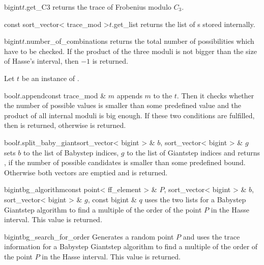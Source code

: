 \begin{cfcode}{bigint}{$t$.get_C3}{}
  returns the trace of Frobenius modulo $C_3$.
\end{cfcode}

\begin{cfcode}{const sort_vector< trace_mod >}{$t$.get_list}{}
  returns the list of s stored internally.
\end{cfcode}

\begin{fcode}{bigint}{$t$.number_of_combinations}{}
  returns the total number of possibilities which have to be checked.  If the product of the
  three moduli is not bigger than the size of Hasse's interval, then $-1$ is returned.
\end{fcode}



\HIGH

Let $t$ be an instance of .

\begin{fcode}{bool}{$t$.append}{const trace_mod & $m$}
  appends $m$ to the  $t$.  Then it checks whether the number of possible
  values is smaller than some predefined value and the product of all internal moduli is big
  enough.  If these two conditions are fulfilled, then \TRUE is returned, otherwise \FALSE is
  returned.
\end{fcode}

\begin{fcode}{bool}{$t$.split_baby_giant}{sort_vector< bigint > & $b$,
    sort_vector< bigint > & $g$}%
  sets $b$ to the list of Babystep indices, $g$ to the list of Giantstep indices and returns
  \TRUE, if the number of possible candidates is smaller than some predefined bound.  Otherwise
  both vectors are emptied and \FALSE is returned.
\end{fcode}

\begin{fcode}{bigint}{bg_algorithm}{const point< ff_element > & $P$,
    sort_vector< bigint > & $b$, sort_vector< bigint > & $g$, const bigint & $q$}%
  uses the two lists for a Babystep Giantstep algorithm to find a multiple of the order of the
  point $P$ in the Hasse interval.  This value is returned.
\end{fcode}

\begin{fcode}{bigint}{bg_search_for_order}{}
  Generates a random point $P$ and uses the trace information for a Babystep Giantstep algorithm
  to find a multiple of the order of the point $P$ in the Hasse interval.  This value is
  returned.
\end{fcode}

